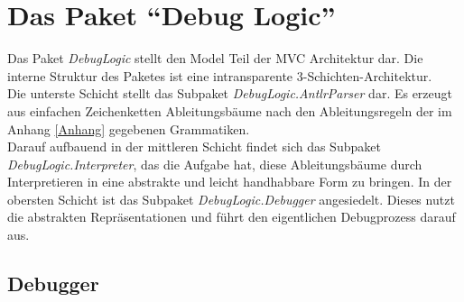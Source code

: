 \documentclass[parskip=full]{scrartcl}
\begin{document}
\section{Das Paket \enquote{Debug Logic}}
\label{DebugLogic}
Das Paket \textit{DebugLogic} stellt den Model Teil der MVC Architektur dar. Die interne Struktur des Paketes ist eine intransparente 3-Schichten-Architektur.\\
Die unterste Schicht stellt das Subpaket \textit{DebugLogic.AntlrParser} dar. Es erzeugt aus einfachen Zeichenketten Ableitungsbäume nach den Ableitungsregeln der im Anhang \ref{Anhang} gegebenen Grammatiken.\\ Darauf aufbauend in der mittleren Schicht findet sich das Subpaket \textit{DebugLogic.Interpreter}, das die Aufgabe hat, diese Ableitungsbäume durch Interpretieren in eine abstrakte und leicht handhabbare Form zu bringen. In der obersten Schicht ist das Subpaket \textit{DebugLogic.Debugger} angesiedelt. Dieses nutzt die abstrakten Repräsentationen und führt den eigentlichen Debugprozess darauf aus.
\subsection{Debugger}
\end{document}
